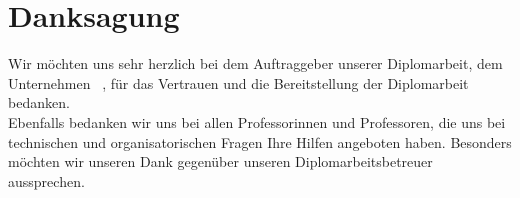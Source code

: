 \chapter{Danksagung}
Wir möchten uns sehr herzlich bei dem Auftraggeber unserer Diplomarbeit, dem Unternehmen \ThPartnerName \, , für das Vertrauen und die Bereitstellung der Diplomarbeit bedanken.\\
Ebenfalls bedanken wir uns bei allen Professorinnen und Professoren, die uns bei technischen und organisatorischen Fragen Ihre Hilfen angeboten haben. Besonders möchten wir unseren Dank gegenüber unseren Diplomarbeitsbetreuer \ThSupervisorName \, aussprechen.